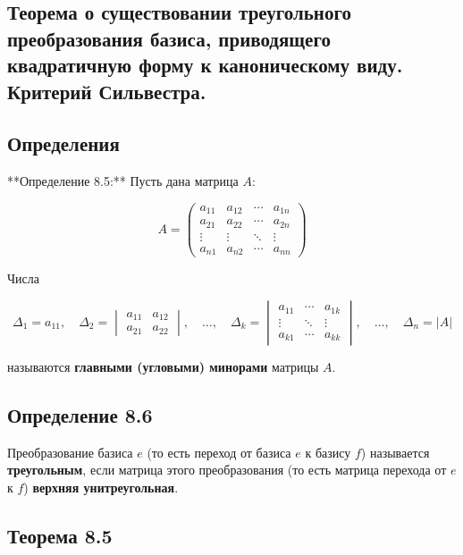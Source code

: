{
\subsection{Теорема о существовании треугольного преобразования базиса, приводящего квадратичную форму к каноническому виду. Критерий Сильвестра.}

\subsection*{Определения}

**Определение 8.5:** Пусть дана матрица \( A \):



\[
A = \begin{pmatrix}
a_{11} & a_{12} & \cdots & a_{1n} \\
a_{21} & a_{22} & \cdots & a_{2n} \\
\vdots & \vdots & \ddots & \vdots \\
a_{n1} & a_{n2} & \cdots & a_{nn}
\end{pmatrix}
\]



Числа 



\[
\Delta_1 = a_{11}, \quad \Delta_2 = \begin{vmatrix}
a_{11} & a_{12} \\
a_{21} & a_{22}
\end{vmatrix}, \quad \ldots, \quad \Delta_k = \begin{vmatrix}
a_{11} & \cdots & a_{1k} \\
\vdots & \ddots & \vdots \\
a_{k1} & \cdots & a_{kk}
\end{vmatrix}, \quad \ldots, \quad \Delta_n = |A|
\]



называются \textbf{главными (угловыми) минорами} матрицы \( A \).

\subsection*{Определение 8.6} Преобразование базиса \( e \) (то есть переход от базиса \( e \) к базису \( f \)) называется \textbf{треугольным}, если матрица этого преобразования (то есть матрица перехода от \( e \) к \( f \)) \textbf{верхняя унитреугольная}.


\subsection*{Теорема 8.5}

}
